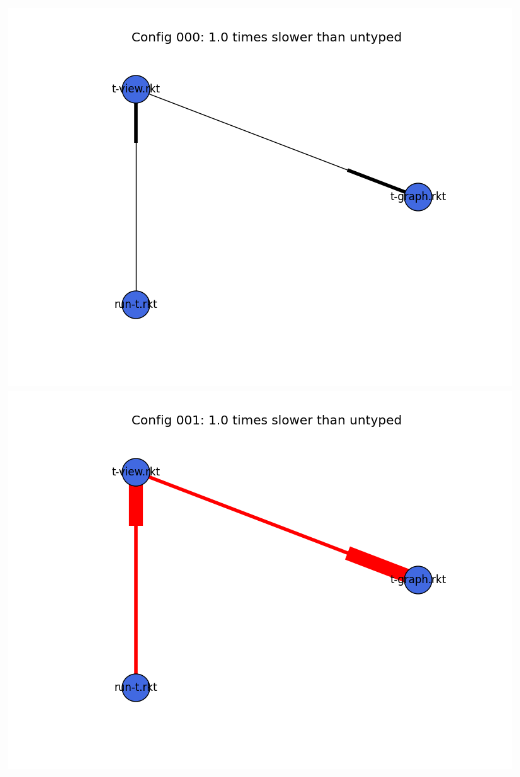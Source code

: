 \documentclass{article}
\begin{document}
\begin{itemize}
\includegraphics[width=\textwidth]{mbta-rs-module-graph-000.png}
\includegraphics[width=\textwidth]{mbta-rs-module-graph-001.png}
\end{itemize}
\end{document}
